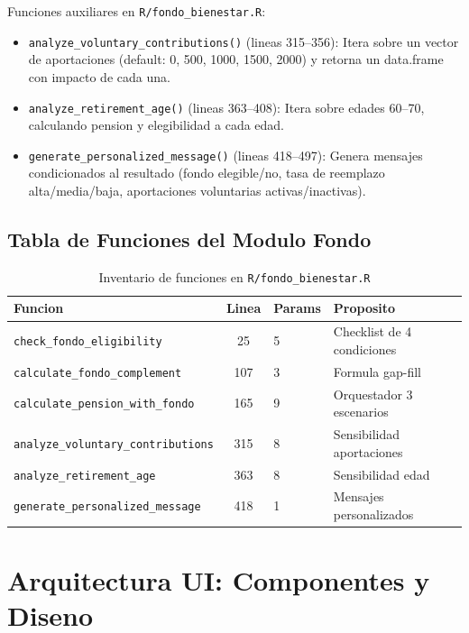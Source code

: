 \documentclass[11pt, letterpaper, twoside]{report}
\begin{document}
\begin{codigobox}
Funciones auxiliares en \texttt{R/fondo\_bienestar.R}:
\begin{itemize}[nosep]
\item \texttt{analyze\_voluntary\_contributions()} (lineas 315--356): Itera sobre
      un vector de aportaciones (default: 0, 500, 1000, 1500, 2000) y retorna
      un data.frame con impacto de cada una.
\item \texttt{analyze\_retirement\_age()} (lineas 363--408): Itera sobre edades
      60--70, calculando pension y elegibilidad a cada edad.
\item \texttt{generate\_personalized\_message()} (lineas 418--497): Genera mensajes
      condicionados al resultado (fondo elegible/no, tasa de reemplazo alta/media/baja,
      aportaciones voluntarias activas/inactivas).
\end{itemize}
\end{codigobox}


\section{Tabla de Funciones del Modulo Fondo}

\begin{table}[h]
\centering
\caption{Inventario de funciones en \texttt{R/fondo\_bienestar.R}}
\label{tab:fondo_functions}
\begin{tabularx}{\textwidth}{lclX}
\toprule
\textbf{Funcion} & \textbf{Linea} & \textbf{Params} & \textbf{Proposito} \\
\midrule
\texttt{check\_fondo\_eligibility} & 25 & 5 & Checklist de 4 condiciones \\
\texttt{calculate\_fondo\_complement} & 107 & 3 & Formula gap-fill \\
\texttt{calculate\_pension\_with\_fondo} & 165 & 9 & Orquestador 3 escenarios \\
\texttt{analyze\_voluntary\_contributions} & 315 & 8 & Sensibilidad aportaciones \\
\texttt{analyze\_retirement\_age} & 363 & 8 & Sensibilidad edad \\
\texttt{generate\_personalized\_message} & 418 & 1 & Mensajes personalizados \\
\bottomrule
\end{tabularx}
\end{table}


\chapter{Arquitectura UI: Componentes y Diseno}
\label{ch:ui}
\end{document}
